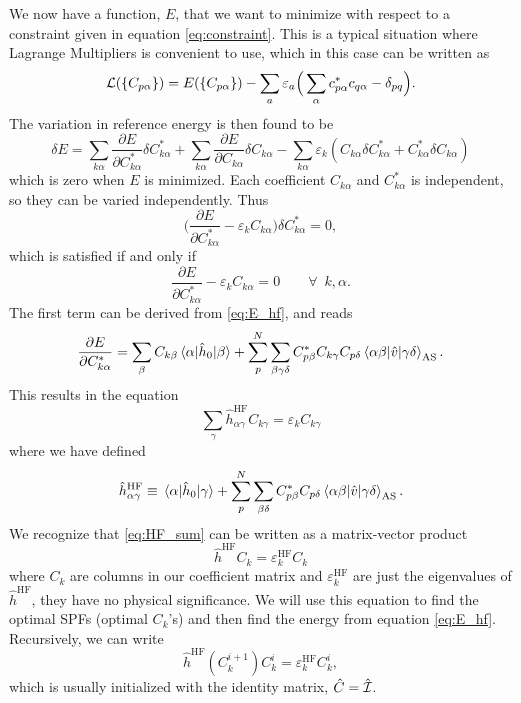 We now have a function, $E$, that we want to minimize with respect to a constraint given in equation \eqref{eq:constraint}. This is a typical situation where Lagrange Multipliers is convenient to use, which in this case can be written as
\begin{equation}
{\cal L}(\{C_{p\alpha}\})=E(\{C_{p\alpha}\})-\sum_a\varepsilon_a\Big(\sum_{\alpha}c_{p\alpha}^*c_{q\alpha}-\delta_{pq}\Big).
\end{equation}
The variation in reference energy is then found to be
\begin{equation}
\delta E=\sum_{k\alpha}\frac{\partial E}{\partial C_{k\alpha}^*}\delta C_{k\alpha}^*+\sum_{k\alpha}\frac{\partial E}{\partial C_{k\alpha}}\delta C_{k\alpha}-\sum_{k\alpha}\varepsilon_k(C_{k\alpha}\delta C_{k\alpha}^*+C_{k\alpha}^*\delta C_{k\alpha})
\label{eq:E_hf}
\end{equation}
which is zero when $E$ is minimized. Each coefficient $C_{k\alpha}$ and $C_{k\alpha}^*$ is independent, so they can be varied independently. Thus
\begin{equation}
\bigg(\frac{\partial E}{\partial C_{k\alpha}^*}-\varepsilon_kC_{k\alpha}\bigg)\delta C_{k\alpha}^*=0,
\end{equation}
which is satisfied if and only if
\begin{equation}
\frac{\partial E}{\partial C_{k\alpha}^*}-\varepsilon_kC_{k\alpha}=0\qquad\forall\,\,\, k,\alpha.
\end{equation}
The first term can be derived from \eqref{eq:E_hf}, and reads
\begin{equation}
\frac{\partial E}{\partial C_{k\alpha}^*}=\sum_{\beta}C_{k\beta}\mel{\alpha}{\hat{h}_0}{\beta}+\sum_p^N\sum_{\beta\gamma\delta}C_{p\beta}^*C_{k\gamma}C_{p\delta}\mel{\alpha\beta}{\hat{v}}{\gamma\delta}_{\text{AS}}.
\end{equation}
This results in the equation
\begin{equation}
\sum_{\gamma}\hat{h}_{\alpha\gamma}^{\text{HF}}C_{k\gamma}=\varepsilon_kC_{k\gamma}
\label{eq:HF_sum}
\end{equation}
where we have defined
\begin{equation}
\hat{h}_{\alpha\gamma}^{\text{HF}}\equiv\mel{\alpha}{\hat{h}_0}{\gamma}+\sum_p^N\sum_{\beta\delta}C_{p\beta}^*C_{p\delta}\mel{\alpha\beta}{\hat{v}}{\gamma\delta}_{\text{AS}}.
\end{equation}
We recognize that \eqref{eq:HF_sum} can be written as a matrix-vector product
\begin{equation}
\hat{h}^{\text{HF}}C_k=\varepsilon_k^{\text{HF}}C_k
\end{equation}
where $C_k$ are columns in our coefficient matrix and $\varepsilon_k^{\text{HF}}$ are just the eigenvalues of $\hat{h}^{\text{HF}}$, they have no physical significance. We will use this equation to find the optimal SPFs (optimal $C_k$'s) and then find the energy from equation \eqref{eq:E_hf}. Recursively, we can write
\begin{equation}
\hat{h}^{\text{HF}}(C_k^{i+1})C_k^i=\varepsilon_k^{\text{HF}}C_k^i,
\label{eq:HF_iter}
\end{equation}
which is usually initialized with the identity matrix, $\hat{C}=\hat{{\cal I}}$.

